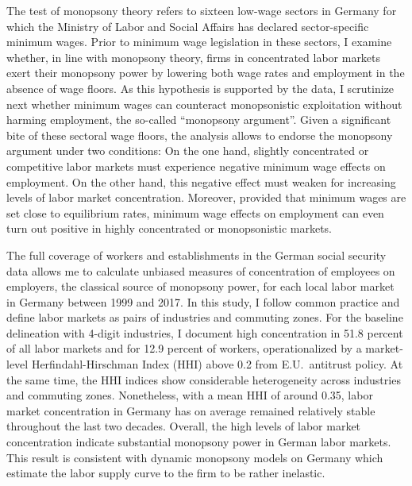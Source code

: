 \documentclass[11pt,oneside,reqno,xcolor=dvipsnames]{article} %
\begin{document}
The test of monopsony theory refers to sixteen low-wage sectors in Germany for which the Ministry of Labor and Social Affairs has declared sector-specific minimum wages. Prior to minimum wage legislation in these sectors, I examine whether, in line with monopsony theory, firms in concentrated labor markets exert their monopsony power by lowering both wage rates and employment in the absence of wage floors. As this hypothesis is supported by the data, I scrutinize next whether minimum wages can counteract monopsonistic exploitation without harming employment, the so-called ``monopsony argument''. Given a significant bite of these sectoral wage floors, the analysis allows to endorse the monopsony argument under two conditions: On the one hand, slightly concentrated or competitive labor markets must experience negative minimum wage effects on employment. On the other hand, this negative effect must weaken for increasing levels of labor market concentration. Moreover, provided that minimum wages are set close to equilibrium rates, minimum wage effects on employment can even turn out positive in highly concentrated or monopsonistic markets.

The full coverage of workers and establishments in the German social security data allows me to calculate unbiased measures of concentration of employees on employers, the classical source of monopsony power, for each local labor market in Germany between 1999 and 2017. In this study, I follow common practice and define labor markets as pairs of industries and commuting zones. For the baseline delineation with 4-digit industries, I document high concentration in 51.8 percent of all labor markets and for 12.9 percent of workers, operationalized by a market-level Herfindahl-Hirschman Index (HHI) above 0.2 from E.U.\ antitrust policy. At the same time, the HHI indices show considerable heterogeneity across industries and commuting zones. Nonetheless, with a mean HHI of around 0.35, labor market concentration in Germany has on average remained relatively stable throughout the last two decades. Overall, the high levels of labor market concentration indicate substantial monopsony power in German labor markets. This result is consistent with dynamic monopsony models on Germany which estimate the labor supply curve to the firm to be rather inelastic.
\end{document}
